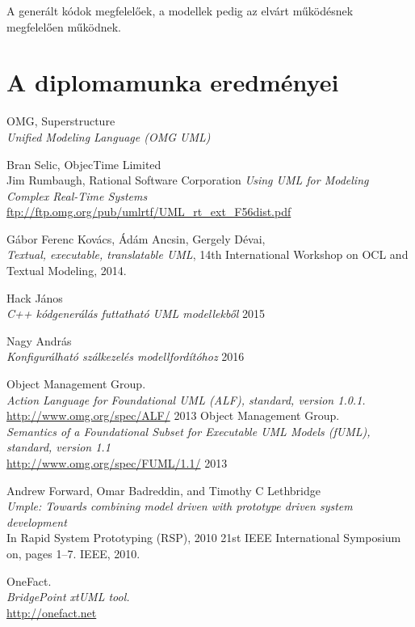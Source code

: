 \documentclass[a4paper,12pt]{report}
\begin{document}
A generált kódok megfelelőek, a modellek pedig az elvárt működésnek megfelelően működnek.

\chapter{A diplomamunka eredményei}


\begin{thebibliography}{4}


	OMG, Superstructure \\
	\emph{Unified Modeling Language (OMG UML)}

	Bran Selic, ObjecTime Limited \\
	Jim Rumbaugh, Rational Software Corporation
	\emph{Using UML for Modeling Complex Real-Time Systems} \\
	\url{ftp://ftp.omg.org/pub/umlrtf/UML_rt_ext_F56dist.pdf}
	
  Gábor Ferenc Kovács, Ádám Ancsin, Gergely Dévai, \\
  \emph{Textual, executable, translatable UML},
  14th International Workshop on OCL and Textual Modeling, 
  2014. 
  
  
	Hack János \\
	\emph{C++ kódgenerálás futtatható UML modellekből} 2015
	
	Nagy András \\
	\emph{Konfigurálható szálkezelés modellfordítóhoz} 2016


	Object Management Group. 	\\
	\emph{Action Language for Foundational UML (ALF), standard, version 1.0.1.}\\
	\url{http://www.omg.org/spec/ALF/} 2013
	Object Management Group. \\
	\emph{Semantics of a Foundational Subset for Executable UML Models (fUML), standard, version 1.1} \\
	\url{http://www.omg.org/spec/FUML/1.1/} 2013
	
	Andrew Forward, Omar Badreddin, and Timothy C Lethbridge \\
	\emph{Umple: Towards combining model driven with prototype driven system development} \\
	In Rapid System Prototyping (RSP), 2010 21st IEEE International Symposium on, pages 1–7. IEEE, 2010.

	OneFact. \\	
	\emph{BridgePoint xtUML tool.} \\
	\url{http://onefact.net}
	

\end{thebibliography}
\end{document}
